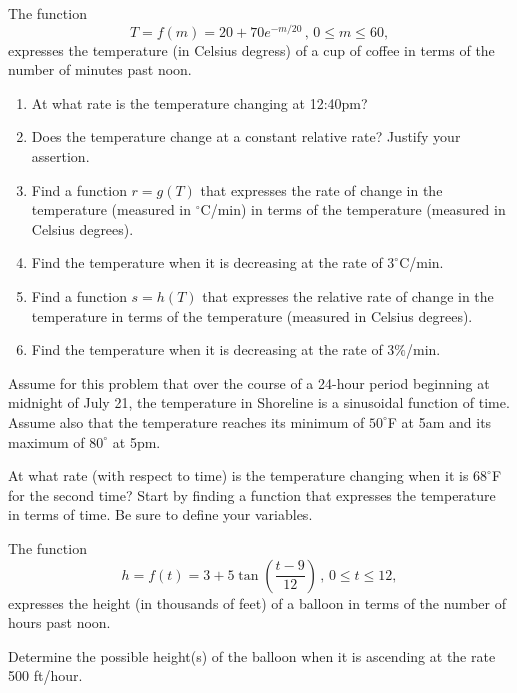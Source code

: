 \documentclass{ximera}
\begin{document}
\begin{question}  \label{Q33eerrggg}
The function
\[
   T = f(m) = 20+70e^{-m/20}\, , \, 0\leq m \leq 60 ,
\]
expresses the temperature (in Celsius degress) of a cup of coffee in terms of the number of minutes past noon.

\begin{enumerate}
\item At what rate is the temperature changing at 12:40pm?

\item Does the temperature change at a constant relative rate? Justify your assertion.

\item Find a function $r=g(T)$ that expresses the rate of change in the temperature (measured in $^\circ$C/min) in terms of the temperature (measured in Celsius degrees).

\item Find the temperature when it is decreasing at the rate of $3^\circ$C/min.

\item Find a function $s=h(T)$ that expresses the relative rate of change in the temperature in terms of the temperature (measured in Celsius degrees).

\item Find the temperature when it is decreasing at the rate of $3\%$/min.
\end{enumerate}
\end{question}


\begin{question} \label{Qggey5ghhtt}
Assume for this problem that over the course of a 24-hour period beginning at midnight of July 21, the temperature in Shoreline is a sinusoidal function of time. Assume also that the temperature reaches its minimum of $50^\circ$F at 5am and its maximum of $80^\circ$ at 5pm.

At what rate (with respect to time) is the temperature changing when it is $68^\circ$F for the second time? Start by finding a function that expresses the temperature in terms of time. Be sure to define your variables.
\end{question}

\begin{question} \label{Qdcgbfghbbnb}
The function
\[
     h = f(t) = 3+5 \tan \left( \frac{t-9}{12}\right) \, , \,  0\leq t\leq 12 ,
\]
expresses the height (in thousands of feet) of a balloon in terms of the number of hours past noon.

Determine the possible height(s) of the balloon when it is ascending at the rate 500 ft/hour.
\end{question}
\end{document}
